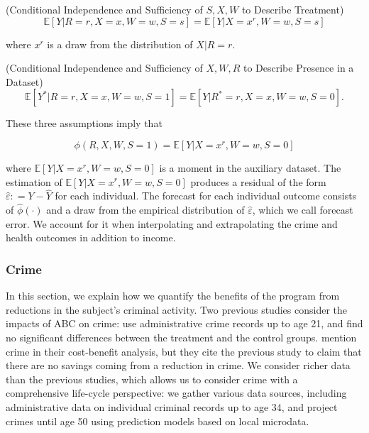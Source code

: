 \begin{assumption} (Conditional Independence and Sufficiency of $S, X, W$ to Describe Treatment)
\begin{equation}
\mathbb{E} \left[ Y | R = r, X = x, W = w, S = s\right] =  \mathbb{E} \left[ Y | X = x^r, W = w, S = s\right]
\end{equation}

\noindent where $x^r$ is a draw from the distribution of $X | R = r$. 
\end{assumption}

\begin{assumption} (Conditional Independence and Sufficiency of $X, W, R$ to Describe Presence in a Dataset)
\begin{equation}
\mathbb{E} \left[ Y^* | R = r, X = x, W = w, S = 1 \right] = \mathbb{E} \left[ Y | R^* = r , X = x, W = w, S = 0\right]. 
\end{equation}
\end{assumption}

\noindent These three assumptions imply that 

\begin{equation}
\phi \left( R, X, W, S = 1 \right) = \mathbb{E} \left[ Y | X = x^r, W = w, S = 0 \right]  
\end{equation}

\noindent where $\mathbb{E} \left[ Y | X = x^r, W = w, S = 0 \right]$ is a moment in the auxiliary dataset. The estimation of $\mathbb{E} \left[ Y | X = x^r, W = w, S = 0 \right]$ produces a residual of the form $\widehat{\varepsilon} : = Y - \widehat{Y}$ for each individual. The forecast for each  individual outcome consists of $\widehat{\phi} \left( \cdot \right)$ and a draw from the empirical distribution of $\widehat{\varepsilon}$, which we call forecast error. We account for it when interpolating and extrapolating the crime and health outcomes in addition to income.

\subsubsection{Crime}  \label{sec:crime}

\noindent In this section, we explain how we quantify the benefits of the program from reductions in the subject's criminal activity. Two previous studies consider the impacts of ABC on crime: \citet{Clarke_Campbell_1998_ABC_Comparison_ECRQ} use administrative crime records up to age 21, and find no significant differences between the treatment and the control groups. \cite{Barnett_Masse_2007_EER} mention crime in their cost-benefit analysis, but they cite the previous study to claim that there are no savings coming from a reduction in crime. We consider richer data than the previous studies, which allows us to consider crime with a comprehensive life-cycle perspective: we gather various data sources, including administrative data on individual criminal records up to age 34, and project crimes until age 50 using prediction models based on local microdata. \\

